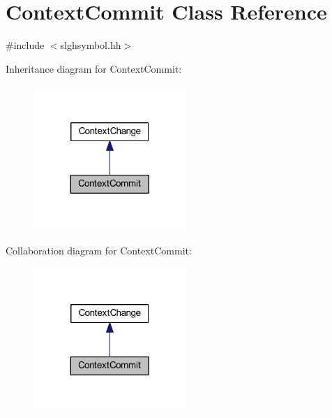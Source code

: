 \hypertarget{class_context_commit}{}\section{Context\+Commit Class Reference}
\label{class_context_commit}


{\ttfamily \#include $<$slghsymbol.\+hh$>$}



Inheritance diagram for Context\+Commit\+:
\nopagebreak
\begin{figure}[H]
\begin{center}
\leavevmode
\includegraphics[width=164pt]{class_context_commit__inherit__graph}
\end{center}
\end{figure}


Collaboration diagram for Context\+Commit\+:
\nopagebreak
\begin{figure}[H]
\begin{center}
\leavevmode
\includegraphics[width=164pt]{class_context_commit__coll__graph}
\end{center}
\end{figure}
